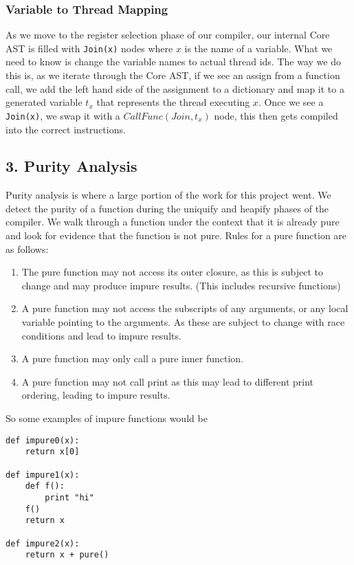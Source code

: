 \documentclass{acm_proc_article-sp}
\begin{document}
\subsubsection*{Variable to Thread Mapping}

As we move to the register selection phase of our compiler, our internal
Core AST is filled with \verb|Join(x)| nodes where $x$ is the name of a variable.
What we need to know is change the variable names to actual thread ids. The way
we do this is, as we iterate through the Core AST, if we see an assign from a
function call, we add the left hand side of the assignment to a dictionary and
map it to a generated variable $t_x$ that represents the thread executing $x$. Once
we see a \verb|Join(x)|, we swap it with a $CallFunc(Join, t_x)$ node, this then
gets compiled into the correct instructions.


\subsection*{3. Purity Analysis}

Purity analysis is where a large portion of the work for this project went. We detect
the purity of a function during the uniquify and heapify phases of the compiler. We walk
through a function under the context that it is already pure and look for evidence that
the function is not pure. Rules for a pure function are as follows:

\begin{enumerate}
\item The pure function may not access its outer closure, as this is subject to change and
may produce impure results. (This includes recursive functions)
\item A pure function may not access the subscripts of any arguments, or any local variable pointing
to the arguments. As these are subject to change with race conditions and lead to impure results.
\item A pure function may only call a pure inner function.
\item A pure function may not call print as this may lead to different print ordering, leading
to impure results.
\end{enumerate}

So some examples of impure functions would be 

\begin{verbatim}
def impure0(x):
    return x[0]

def impure1(x):
    def f():
        print "hi"
    f()
    return x

def impure2(x):
    return x + pure()
\end{verbatim}
\end{document}
